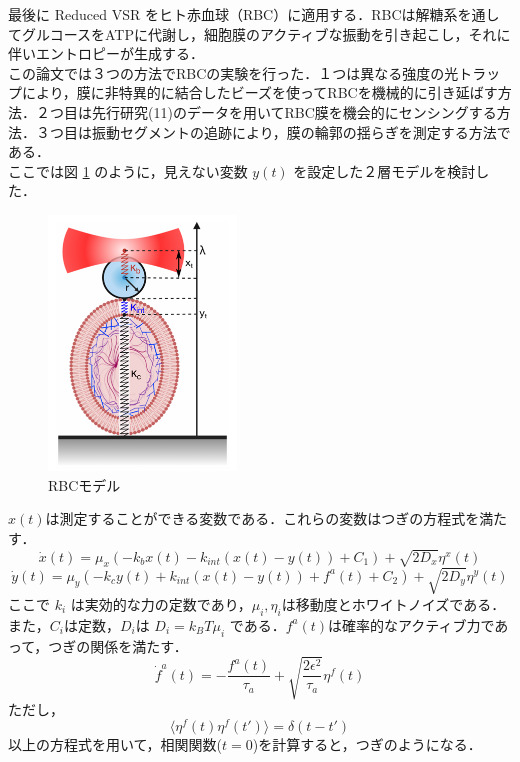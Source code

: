 \documentclass{jsarticle}
\numberwithin{equation}{section}
\theoremstyle{definition}
\newcommand{\ave}[1]{\langle #1 \rangle}
\begin{document}
最後に Reduced VSR をヒト赤血球（RBC）に適用する．RBCは解糖系を通してグルコースをATPに代謝し，細胞膜のアクティブな振動を引き起こし，それに伴いエントロピーが生成する．\\
この論文では３つの方法でRBCの実験を行った．１つは異なる強度の光トラップにより，膜に非特異的に結合したビーズを使ってRBCを機械的に引き延ばす方法．２つ目は先行研究(11)のデータを用いてRBC膜を機会的にセンシングする方法．３つ目は振動セグメントの追跡により，膜の輪郭の揺らぎを測定する方法である．\\
ここでは図 \ref{rbc_1} のように，見えない変数 $y(t)$ を設定した２層モデルを検討した．

\begin{figure}[H]
  \begin{center}  
  \includegraphics[width=5cm]{rbc.png}  
  \end{center}
  \caption{RBCモデル}
  \label{rbc_1}
\end{figure}

$x(t)$は測定することができる変数である．これらの変数はつぎの方程式を満たす．
\begin{equation}
  \dot{x}(t) = \mu_x (-k_b x(t) - k_{int}(x(t) - y(t)) + C_1) + \sqrt{2D_x} \eta^x (t) 
\end{equation}
\begin{equation}
  \dot{y}(t) = \mu_y (-k_c y(t) + k_{int}(x(t) - y(t)) + f^a (t) + C_2) + \sqrt{2D_y} \eta^y (t) 
\end{equation}
ここで $k_{i}$ は実効的な力の定数であり，$\mu_{i}, \eta_{i}$は移動度とホワイトノイズである．また，$C_i$は定数，$D_i$は $D_i = k_B T \mu_i$ である．$f^a (t)$は確率的なアクティブ力であって，つぎの関係を満たす．
\begin{equation}
  \dot{f}^a (t) = - \frac{f^a (t)}{\tau_a} + \sqrt{\frac{2 \epsilon^2}{\tau_a}} \eta^f (t)
\end{equation}
ただし，
\begin{equation}
  \ave{\eta^f (t) \eta^f (t')} = \delta (t - t')
\end{equation}
以上の方程式を用いて，相関関数($t = 0$)を計算すると，つぎのようになる．
\end{document}
